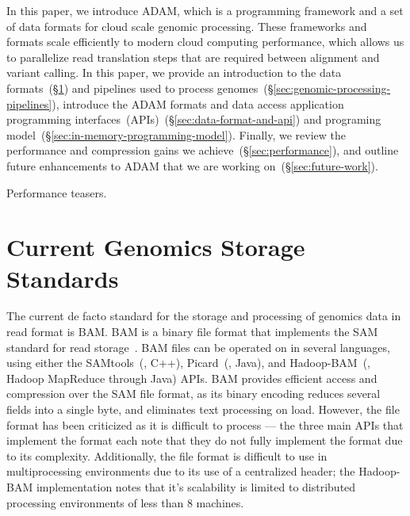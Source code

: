\documentclass[10pt,twocolumn]{article}
\theoremstyle{plain}
\begin{document}
In this paper, we introduce ADAM, which is a programming framework and a set of data formats for cloud scale genomic
processing. These frameworks and formats scale efficiently to modern cloud computing performance, which allows us to
parallelize read translation steps that are required between alignment and variant calling. In this paper, we provide an
introduction to the data formats~(\S\ref{sec:current-genomics-storage-standards}) and pipelines used to process
genomes~(\S\ref{sec:genomic-processing-pipelines}), introduce the ADAM formats and data access
application programming interfaces~(APIs)~(\S\ref{sec:data-format-and-api}) and programing
model~(\S\ref{sec:in-memory-programming-model}). Finally, we review the performance and compression gains we
achieve~(\S\ref{sec:performance}), and outline future enhancements to ADAM that we are working on~(\S\ref{sec:future-work}).

Performance teasers.

\section{Current Genomics Storage Standards}
\label{sec:current-genomics-storage-standards}

The current de facto standard for the storage and processing of genomics data in read format is BAM. BAM is a binary file
format that implements the SAM standard for read storage~\cite{li09}. BAM files can be operated on in several languages,
using either the SAMtools~(\cite{li09}, C++), Picard~(\cite{picard}, Java), and Hadoop-BAM~(\cite{niemenmaa12}, Hadoop
MapReduce through Java) APIs. BAM provides efficient access and compression over the SAM file format, as its binary
encoding reduces several fields into a single byte, and eliminates text processing on load. However, the file format has been
criticized as it is difficult to process --- the three main APIs that implement the format each note that they do not fully implement
the format due to its complexity. Additionally, the file format is difficult to use in multiprocessing environments due to its use
of a centralized header; the Hadoop-BAM implementation notes that it's scalability is limited to distributed processing
environments of less than 8 machines.
\end{document}
